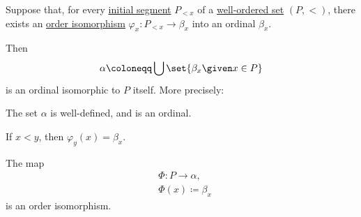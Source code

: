 \begin{lemma}\label{thm:order_type_existence_lemma}
  Suppose that, for every \hyperref[def:order_interval/unbounded]{initial segment} \( P_{<x} \) of a \hyperref[def:well_ordered_set]{well-ordered set} \( (P, <) \), there exists an \hyperref[def:partially_ordered_set/morphism]{order isomorphism} \( \varphi_x: P_{<x} \to \beta_x \) into an ordinal \( \beta_x \).

  Then
  \begin{equation*}
    \alpha \coloneqq \bigcup \set{ \beta_x \given x \in P }
  \end{equation*}
  is an ordinal isomorphic to \( P \) itself. More precisely:

  \begin{thmenum}
     The set \( \alpha \) is well-defined, and is an ordinal.

     If \( x < y \), then \( \varphi_y(x) = \beta_x \).

     The map
    \begin{equation*}
      \begin{aligned}
        &\Phi: P \to \alpha, \\
        &\Phi(x) \coloneqq \beta_x
      \end{aligned}
    \end{equation*}
    is an order isomorphism.
  \end{thmenum}
\end{lemma}
